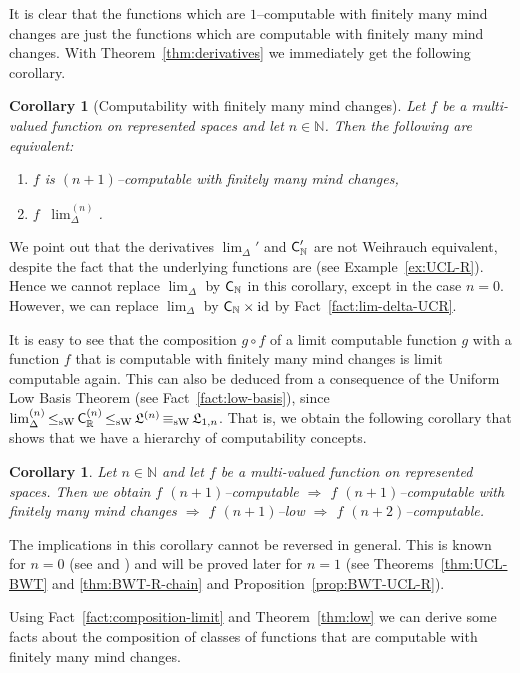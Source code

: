 \documentclass[a4paper]{amsart}
\def\IN{{\mathbb{N}}}
\def\IR{{\mathbb{R}}}
\def\Low{\mathfrak{L}}
\def\TO{\Longrightarrow}
\def\id{{\rm id}}
\def\C{\mbox{\rm\sffamily C}}
\def\leqW{\mathop{\leq_{\mathrm{W}}}}
\def\leqSW{\mathop{\leq_{\mathrm{sW}}}}
\def\equivSW{\mathop{\equiv_{\mathrm{sW}}}}
\newtheorem{corollary}[theorem]{Corollary}
\theoremstyle{definition}
\begin{document}
It is clear that the functions which are $1$--computable with finitely
many mind changes are just the functions which are computable with finitely many mind changes.
With Theorem~\ref{thm:derivatives} we immediately get the following corollary.

\begin{corollary}[Computability with finitely many mind changes]
\label{cor:finitely-many-mind-changes}
Let $f$ be a multi-valued function on represented spaces and let $n\in\IN$. 
Then the following are equivalent:
\begin{enumerate}
\item $f$ is $(n+1)$--computable with finitely many mind changes,
\item $f\leqW\lim_\Delta^{(n)}$.
\end{enumerate}
\end{corollary}

We point out that the derivatives $\lim_\Delta'$ and $\C_\IN'$ are not Weihrauch equivalent,
despite the fact that the underlying functions are (see Example~\ref{ex:UCL-R}).
Hence we cannot replace $\lim_\Delta$ by $\C_\IN$ in this corollary, except in the case $n=0$.
However, we can replace $\lim_\Delta$ by $\C_\IN\times\id$ by Fact~\ref{fact:lim-delta-UCR}.

It is easy to see that the composition $g\circ f$ of a limit computable function $g$ with a 
function $f$ that is computable with finitely many mind changes is limit computable again.
This can also be deduced from a consequence of the Uniform Low Basis Theorem (see Fact~\ref{fact:low-basis}), 
since $\lim_\Delta^{(n)}\leqSW\C_\IR^{(n)}\leqSW\Low^{(n)}\equivSW\Low_{1,n}$. 
That is, we obtain the following corollary that shows that we 
have a hierarchy of computability concepts.

\begin{corollary}
\label{cor:finite-low}
Let $n\in\IN$ and let $f$ be a multi-valued function on represented spaces.
Then we obtain $f$ $(n+1)$--computable $\TO$ $f$ $(n+1)$--computable with finitely many mind changes $\TO$ $f$ $(n+1)$--low
$\TO$ $f$ $(n+2)$--computable.
\end{corollary}

The implications in this corollary cannot be reversed in general. This is known for $n=0$ (see \cite{BG11a} and \cite{BBP})
and will be proved later for $n=1$ (see Theorems~\ref{thm:UCL-BWT} and \ref{thm:BWT-R-chain}
and Proposition~\ref{prop:BWT-UCL-R}). 

Using Fact~\ref{fact:composition-limit} and Theorem~\ref{thm:low} we can
derive some facts about the composition of classes of functions that are computable with finitely many mind changes.
\end{document}

